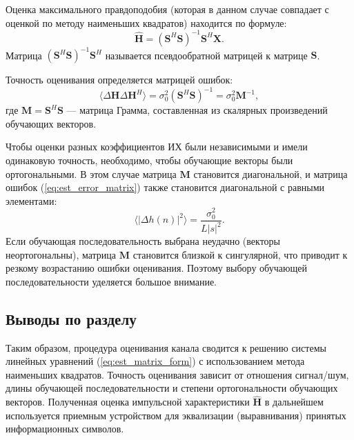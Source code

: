 Оценка максимального правдоподобия (которая в данном случае совпадает с оценкой по методу наименьших квадратов) находится по формуле:
\begin{equation}
    \hat{\mathbf{H}} = (\mathbf{S}^H \mathbf{S})^{-1} \mathbf{S}^H \mathbf{X}.
    \label{eq:est_ls}
\end{equation}
Матрица $(\mathbf{S}^H \mathbf{S})^{-1} \mathbf{S}^H$ называется псевдообратной матрицей к матрице $\mathbf{S}$.

Точность оценивания определяется матрицей ошибок:
\begin{equation}
    \langle \Delta \mathbf{H} \Delta \mathbf{H}^H \rangle = \sigma_0^2 (\mathbf{S}^H \mathbf{S})^{-1} = \sigma_0^2 \mathbf{M}^{-1},
    \label{eq:est_error_matrix}
\end{equation}
где $\mathbf{M} = \mathbf{S}^H \mathbf{S}$ --- матрица Грамма, составленная из скалярных произведений обучающих векторов.

Чтобы оценки разных коэффициентов ИХ были независимыми и имели одинаковую точность, необходимо, чтобы обучающие векторы были ортогональными. В этом случае матрица $\mathbf{M}$ становится диагональной, и матрица ошибок (\ref{eq:est_error_matrix}) также становится диагональной с равными элементами:
\begin{equation}
    \langle |\Delta h(n)|^2 \rangle = \frac{\sigma_0^2}{L |s|^2}.
\end{equation}
Если обучающая последовательность выбрана неудачно (векторы неортогональны), матрица $\mathbf{M}$ становится близкой к сингулярной, что приводит к резкому возрастанию ошибки оценивания. Поэтому выбору обучающей последовательности уделяется большое внимание.

\subsection*{Выводы по разделу}

Таким образом, процедура оценивания канала сводится к решению системы линейных уравнений (\ref{eq:est_matrix_form}) с использованием метода наименьших квадратов. Точность оценивания зависит от отношения сигнал/шум, длины обучающей последовательности и степени ортогональности обучающих векторов. Полученная оценка импульсной характеристики $\hat{\mathbf{H}}$ в дальнейшем используется приемным устройством для эквализации (выравнивания) принятых информационных символов.